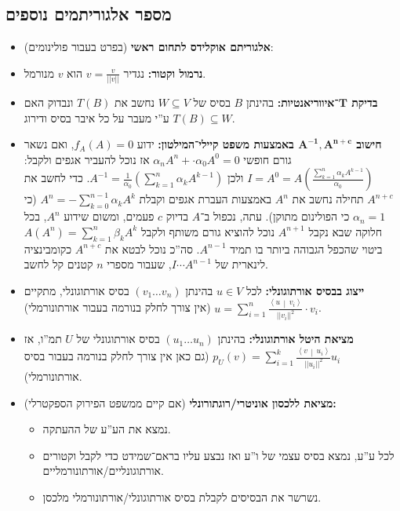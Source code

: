 \documentclass[a4paper]{article}
\newcommand\ra    {\rangle}
\newcommand\la    {\langle}
\newcommand\sumnko    {\sum_{k = 1}^{n}}
\newcommand\sumnio    {\sum_{i = 1}^{n}}
\newcommand\norm[1]   {\left \vert \left \vert #1 \right \vert \right \vert}
\newcommand\mut [2]   {\left \la #1 \,\middle\vert\, #2 \right \ra}
\newcommand\ag        {\alpha}
\newcommand\bg        {\beta}
\newcommand\op    {^{-1}}
\newcommand\cl [1]    {\left ( #1 \right )}
\theoremstyle{definition}
\begin{document}
	\subsection{מספר אלגוריתמים נוספים}
	\begin{itemize}
		\item \textbf{אלגוריתם אוקלידס לתחום ראשי} (בפרט בעבור פולינומים): 
		\item \textbf{נרמול וקטור: }נגדיר $v = \frac{v}{\norm{v}}$ הוא $v$ מנורמל. 
		\item \textbf{בדיקת $\bm{T}$־איווריאנטיות: }בהינתן $B$ בסיס של $W \subseteq V$ נחשב את $T(B)$ ונבדוק האם $T(B) \subseteq W$ ע''י מעבר על כל איבר בסיס ודירוג. 
		\item \textbf{חישוב $\bm{A\op, A^{n + c}}$ באמצעות משפט קיילי־המילטון: }ידוע $f_A(A) = 0$, ואם נשאר גורם חופשי $\ag_nA^{n} + \cdot \ag_0 A^{0} = 0$ אז נוכל להעביר אגפים ולקבל: $I = A^0 = A\cl{\frac{\sum_{k = 1}^{n}\ag_kA^{k - 1}}{\ag_0}}$ ולכן $A\op = \frac{1}{\ag_0}\cl{\sumnko \ag_k A^{k - 1}}$. כדי לחשב את $A^{n + c}$ תחילה נחשב את $A^{n}$ באמצעות העברת אגפים וקבלת $A^{n} = -\sum_{k = 0}^{n - 1} \ag_kA^{k}$ (כי $\ag_n = 1$ כי הפולינום מתוקן). עתה, נכפול ב־$A$ בדיוק $c$ פעמים, ומשום שידוע $A^{n}$, בכל חלוקה שבא נקבל $A^{n + 1}$ נוכל להוציא גורם משותף ולקבל $A(A^{n}) = \sumnko \bg_kA^{k}$ ביטוי שהכפל הגבוהה ביותר בו תמיד $A^{n - 1}$. סה''כ נוכל לבטא את $A^{n + c}$ כקומבינציה לינארית של $I \cdots A^{n - 1}$, שעבור מספרי $n$ קטנים קל לחשב. 
		\item \textbf{ייצוג בבסיס אורתוגונלי: }לכל $u \in V$ בהינתן $(v_1 \dots v_n)$ בסיס אורתוגונלי, מתקיים $u = \sumnio \frac{\mut{u}{v_i}}{\norm{v_i}^{2}} \cdot v_i$ (אין צורך לחלק בנורמה בעבור אורתונורמלי). 
		\item \textbf{מציאת היטל אורתוגונלי: }בהינתן $(u_1 \dots u_n)$ בסיס אורתוגונלי של $U$ תמ''ו, אז $p_U(v) = \sum_{i = 1}^{k}\frac{\mut{v}{u_i}}{\norm{u_i}^2}u_i$ (גם כאן אין צורך לחלק בנורמה בעבור בסיס אורתונורמלי). 
		\item \textbf{מציאת ללכסון אוניטרי/רוגתורונלי} (אם קיים ממשפט הפירוק הספקטרלי)\textbf{: }
		\begin{itemize}
			\item נמצא את הע''ע של ההעתקה. 
			\item לכל ע''ע, נמצא בסיס עצמי של ו''ע ואז נבצע עליו בראם־שמידט כדי לקבל וקטורים אורתוגונליים/אורתונורמליים. 
			\item נשרשר את הבסיסים לקבלת בסיס אורתוגונלי/אורתונורמלי מלכסן. 
		\end{itemize}
	\end{itemize}
	
\end{document}
